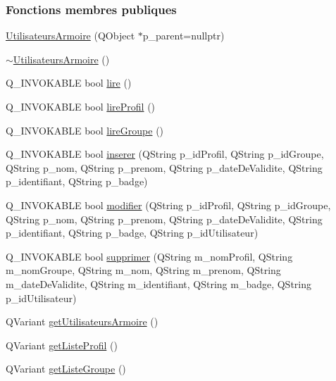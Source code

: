 \subsubsection*{Fonctions membres publiques}
\begin{DoxyCompactItemize}
\item 
\hyperlink{class_utilisateurs_armoire_a13efbad7862f1c6eff0301c659ec7360}{Utilisateurs\+Armoire} (Q\+Object $\ast$p\+\_\+parent=nullptr)
\item 
\hyperlink{class_utilisateurs_armoire_a980367259be2684f8f0762ea80deb9d9}{$\sim$\+Utilisateurs\+Armoire} ()
\item 
Q\+\_\+\+I\+N\+V\+O\+K\+A\+B\+LE bool \hyperlink{class_utilisateurs_armoire_a10b2038874606c0afccf0f18c038dd0c}{lire} ()
\item 
Q\+\_\+\+I\+N\+V\+O\+K\+A\+B\+LE bool \hyperlink{class_utilisateurs_armoire_a952931c38642273c5e959edb69706144}{lire\+Profil} ()
\item 
Q\+\_\+\+I\+N\+V\+O\+K\+A\+B\+LE bool \hyperlink{class_utilisateurs_armoire_aeadd41da356116c6e393d832e2b819e9}{lire\+Groupe} ()
\item 
Q\+\_\+\+I\+N\+V\+O\+K\+A\+B\+LE bool \hyperlink{class_utilisateurs_armoire_a773bfde7c49dac8fa2c8a1c9a43592c0}{inserer} (Q\+String p\+\_\+id\+Profil, Q\+String p\+\_\+id\+Groupe, Q\+String p\+\_\+nom, Q\+String p\+\_\+prenom, Q\+String p\+\_\+date\+De\+Validite, Q\+String p\+\_\+identifiant, Q\+String p\+\_\+badge)
\item 
Q\+\_\+\+I\+N\+V\+O\+K\+A\+B\+LE bool \hyperlink{class_utilisateurs_armoire_affd91d7591d57b8dafc098f09b9319aa}{modifier} (Q\+String p\+\_\+id\+Profil, Q\+String p\+\_\+id\+Groupe, Q\+String p\+\_\+nom, Q\+String p\+\_\+prenom, Q\+String p\+\_\+date\+De\+Validite, Q\+String p\+\_\+identifiant, Q\+String p\+\_\+badge, Q\+String p\+\_\+id\+Utilisateur)
\item 
Q\+\_\+\+I\+N\+V\+O\+K\+A\+B\+LE bool \hyperlink{class_utilisateurs_armoire_a035d7ca496ddaaf83467934fbd694883}{supprimer} (Q\+String m\+\_\+nom\+Profil, Q\+String m\+\_\+nom\+Groupe, Q\+String m\+\_\+nom, Q\+String m\+\_\+prenom, Q\+String m\+\_\+date\+De\+Validite, Q\+String m\+\_\+identifiant, Q\+String m\+\_\+badge, Q\+String p\+\_\+id\+Utilisateur)
\item 
Q\+Variant \hyperlink{class_utilisateurs_armoire_a39e5692fe0b00097732bb7633ae5d1e5}{get\+Utilisateurs\+Armoire} ()
\item 
Q\+Variant \hyperlink{class_utilisateurs_armoire_a153930c5840343585f2d0195405df382}{get\+Liste\+Profil} ()
\item 
Q\+Variant \hyperlink{class_utilisateurs_armoire_a5fd8e356a1fffd330f47935dfb843e6a}{get\+Liste\+Groupe} ()
\end{DoxyCompactItemize}
